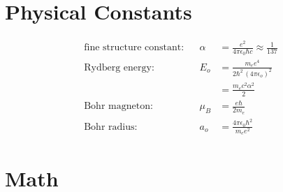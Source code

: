 \documentclass[10pt,twocolumn]{article}
\date{April 2, 2007}
\newcommand{\sigaussian}[2]{#1} %
\newcommand{\fourpiepsilono}{\sigaussian{4\pi\epsilon_0}{}}
\begin{document}
  \section{Physical Constants}
  \begin{align*}
    \text{fine structure constant}:  &&\alpha &= \frac{e^2}{\fourpiepsilono
    \hbar c} \approx \frac{1}{137}\\
    \text{Rydberg energy}:  &&E_o &= \frac{m_e e^4}{2\hbar^2 \,\sigaussian{(4\pi\epsilon_o)^2}{}}\\
    && &= \frac{m_ec^2\alpha^2}2 \\
    \text{Bohr magneton}:  &&\mu_B &= \frac{e\hbar}{2m_e\sigaussian{}{c}} \\
    \text{Bohr radius}:  &&a_o &= \frac{\fourpiepsilono\hbar^2}{m_e e^2}
  \end{align*}

  \section{Math}
\end{document}
